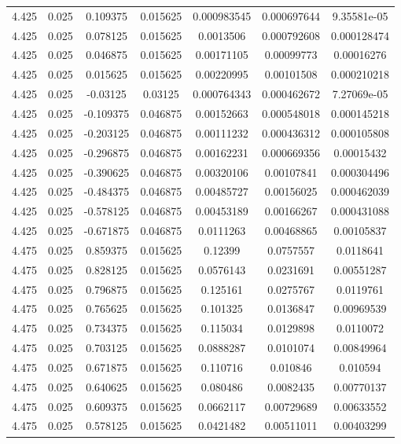 \begin{flushleft}
\begin{longtable}{ccccccc}
4.425 & 0.025 & 0.109375 & 0.015625 & 0.000983545 & 0.000697644 & 9.35581e-05  \\ 
4.425 & 0.025 & 0.078125 & 0.015625 & 0.0013506 & 0.000792608 & 0.000128474  \\ 
4.425 & 0.025 & 0.046875 & 0.015625 & 0.00171105 & 0.00099773 & 0.00016276  \\ 
4.425 & 0.025 & 0.015625 & 0.015625 & 0.00220995 & 0.00101508 & 0.000210218  \\ 
4.425 & 0.025 & -0.03125 & 0.03125 & 0.000764343 & 0.000462672 & 7.27069e-05  \\ 
4.425 & 0.025 & -0.109375 & 0.046875 & 0.00152663 & 0.000548018 & 0.000145218  \\ 
4.425 & 0.025 & -0.203125 & 0.046875 & 0.00111232 & 0.000436312 & 0.000105808  \\ 
4.425 & 0.025 & -0.296875 & 0.046875 & 0.00162231 & 0.000669356 & 0.00015432  \\ 
4.425 & 0.025 & -0.390625 & 0.046875 & 0.00320106 & 0.00107841 & 0.000304496  \\ 
4.425 & 0.025 & -0.484375 & 0.046875 & 0.00485727 & 0.00156025 & 0.000462039  \\ 
4.425 & 0.025 & -0.578125 & 0.046875 & 0.00453189 & 0.00166267 & 0.000431088  \\ 
4.425 & 0.025 & -0.671875 & 0.046875 & 0.0111263 & 0.00468865 & 0.00105837  \\ 
4.475 & 0.025 & 0.859375 & 0.015625 & 0.12399 & 0.0757557 & 0.0118641  \\ 
4.475 & 0.025 & 0.828125 & 0.015625 & 0.0576143 & 0.0231691 & 0.00551287  \\ 
4.475 & 0.025 & 0.796875 & 0.015625 & 0.125161 & 0.0275767 & 0.0119761  \\ 
4.475 & 0.025 & 0.765625 & 0.015625 & 0.101325 & 0.0136847 & 0.00969539  \\ 
4.475 & 0.025 & 0.734375 & 0.015625 & 0.115034 & 0.0129898 & 0.0110072  \\ 
4.475 & 0.025 & 0.703125 & 0.015625 & 0.0888287 & 0.0101074 & 0.00849964  \\ 
4.475 & 0.025 & 0.671875 & 0.015625 & 0.110716 & 0.010846 & 0.010594  \\ 
4.475 & 0.025 & 0.640625 & 0.015625 & 0.080486 & 0.0082435 & 0.00770137  \\ 
4.475 & 0.025 & 0.609375 & 0.015625 & 0.0662117 & 0.00729689 & 0.00633552  \\ 
4.475 & 0.025 & 0.578125 & 0.015625 & 0.0421482 & 0.00511011 & 0.00403299  \\ 

\end{longtable}
\end{flushleft}
